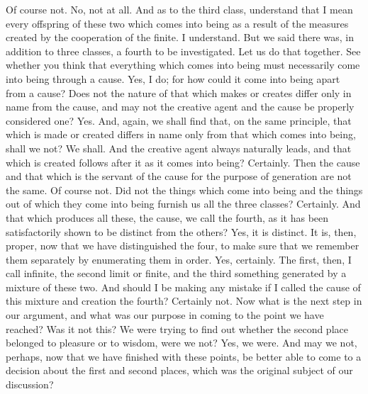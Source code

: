 \documentclass[letterpaper,12pt]{article}
\newcommand{\stephpag}[1]{\marginnote{\small\itshape\fontfamily{ppl}\selectfont #1}}
\begin{document}
\begin{drama}
\protarchusspeaks
Of course not.
\socratesspeaks
No, not at all. And as to the third class, understand that I mean every offspring of these two which comes into being as a result of the measures created by the cooperation of the finite.
\protarchusspeaks
I understand. \stephpag{e}
\socratesspeaks
But we said there was, in addition to three classes, a fourth to be investigated. Let us do that together. See whether you think that everything which comes into being must necessarily come into being through a cause.
\protarchusspeaks
Yes, I do; for how could it come into being apart from a cause?
\socratesspeaks
Does not the nature of that which makes or creates differ only in name from the cause, and may not the creative agent and the cause be properly considered one?
\protarchusspeaks
Yes. \stephpag{27 a}
\socratesspeaks
And, again, we shall find that, on the same principle, that which is made or created differs in name only from that which comes into being, shall we not?
\protarchusspeaks
We shall.
\socratesspeaks
And the creative agent always naturally leads, and that which is created follows after it as it comes into being?
\protarchusspeaks
Certainly.
\socratesspeaks
Then the cause and that which is the servant of the cause for the purpose of generation are not the same.
\protarchusspeaks
Of course not.
\socratesspeaks
Did not the things which come into being and the things out of which they come into being furnish us all the three classes?
\protarchusspeaks
Certainly. \stephpag{b}
\socratesspeaks
And that which produces all these, the cause, we call the fourth, as it has been satisfactorily shown to be distinct from the others?
\protarchusspeaks
Yes, it is distinct.
\socratesspeaks
It is, then, proper, now that we have distinguished the four, to make sure that we remember them separately by enumerating them in order.
\protarchusspeaks
Yes, certainly.
\socratesspeaks
The first, then, I call infinite, the second limit or finite, and the third something generated by a mixture of these two. And should I be making any mistake if I called \stephpag{c} the cause of this mixture and creation the fourth?
\protarchusspeaks
Certainly not.
\socratesspeaks
Now what is the next step in our argument, and what was our purpose in coming to the point we have reached? Was it not this? We were trying to find out whether the second place belonged to pleasure or to wisdom, were we not?
\protarchusspeaks
Yes, we were.
\socratesspeaks
And may we not, perhaps, now that we have finished with these points, be better able to come to a decision about the first and second places, which was the original subject of our discussion?

\end{drama}
\end{document}
